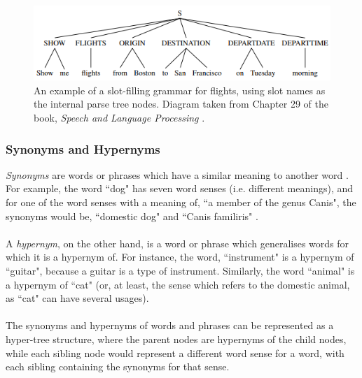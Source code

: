 \documentclass[11pt]{article}
\begin{document}
\begin{center}
\begin{figure}[H]
\begin{center}
  \includegraphics[scale=1]{slot-filling.png}
  \caption{An example of a slot-filling grammar for flights, using slot names as the internal parse tree nodes. Diagram taken from Chapter 29 of the book, \textit{Speech and Language Processing} \cite{RefWorks:107}.}
  \label{fig:slot-filling-diagram-example}
  \end{center}
\end{figure}
\end{center}


\subsubsection{Synonyms and Hypernyms}

\textit{Synonyms} are words or phrases which have a similar meaning to another word  \cite{RefWorks:44}. For example, the word ``dog" has seven word senses (i.e. different meanings), and for one of the word senses with a meaning of, ``a member of the genus Canis", the synonyms would be, ``domestic dog" and ``Canis familiris" \cite{RefWorks:45}.
\\
\\
A \textit{hypernym}, on the other hand, is a word or phrase which generalises words for which it is a hypernym of. For instance, the word, ``instrument" is a hypernym of ``guitar", because a guitar is a type of instrument. Similarly, the word ``animal" is a hypernym of ``cat" (or, at least, the sense which refers to the domestic animal, as ``cat" can have several usages).
\\
\\
The synonyms and hypernyms of words and phrases can be represented as a hyper-tree structure, where the parent nodes are hypernyms of the child nodes, while each sibling node would represent a different word sense for a word, with each sibling containing the synonyms for that sense.
\end{document}
